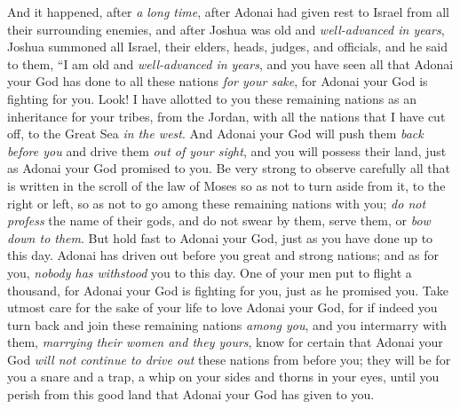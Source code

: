 \begin{biblechapter} %
 And it happened, after \textit{a long time}, after Adonai had given rest to Israel from all their surrounding enemies, and after Joshua was old and \textit{well-advanced in years},
\verse Joshua summoned all Israel, their elders, heads, judges, and officials, and he said to them, “I am old and \textit{well-advanced in years},
\verse and you have seen all that Adonai your God has done to all these nations \textit{for your sake}, for Adonai your God is fighting for you.
\verse Look! I have allotted to you these remaining nations as an inheritance for your tribes, from the Jordan, with all the nations that I have cut off, to the Great Sea \textit{in the west}.
\verse And Adonai your God will push them \textit{back before you} and drive them \textit{out of your sight}, and you will possess their land, just as Adonai your God promised to you.
\verse Be very strong to observe carefully all that is written in the scroll of the law of Moses so as not to turn aside from it, to the right or left,
\verse so as not to go among these remaining nations with you; \textit{do not profess} the name of their gods, and do not swear by them, serve them, or \textit{bow down to them}.
\verse But hold fast to Adonai your God, just as you have done up to this day.
\verse Adonai has driven out before you great and strong nations; and as for you, \textit{nobody has withstood} you to this day.
\verse One of your men put to flight a thousand, for Adonai your God is fighting for you, just as he promised you.
\verse Take utmost care for the sake of your life to love Adonai your God,
\verse for if indeed you turn back and join these remaining nations \textit{among you}, and you intermarry with them, \textit{marrying their women and they yours},
\verse know for certain that Adonai your God \textit{will not continue to drive out} these nations from before you; they will be for you a snare and a trap, a whip on your sides and thorns in your eyes, until you perish from this good land that Adonai your God has given to you.

\end{biblechapter}

